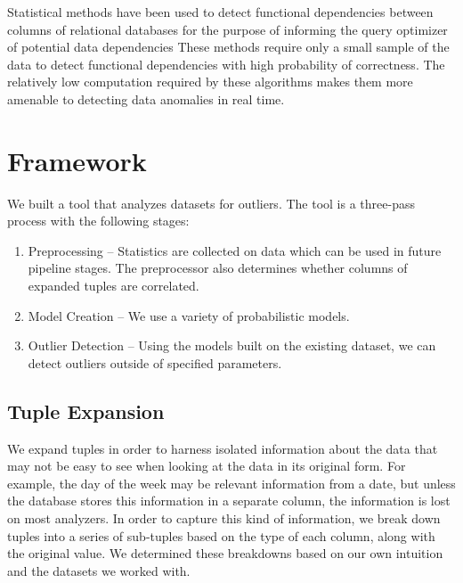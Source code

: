 \documentclass{vldb}
\begin{document}
Statistical methods have been used to detect functional dependencies between columns of relational databases for the purpose of informing the query optimizer of potential data dependencies \cite{Ilyas2004} 
These methods require only a small sample of the data to detect functional dependencies with high probability of correctness.
The relatively low computation required by these algorithms makes them more amenable to detecting data anomalies in real time.

\section{Framework}
We built a tool that analyzes datasets for outliers.
The tool is a three-pass process with the following stages:
\begin{enumerate}
\item Preprocessing -- Statistics are collected on data which can be used in future pipeline stages. The preprocessor also determines whether columns of expanded tuples are correlated.
\item Model Creation -- We use a variety of probabilistic models. 
\item Outlier Detection -- Using the models built on the existing dataset, we can detect outliers outside of specified parameters.
\end{enumerate}

\subsection{Tuple Expansion}
We expand tuples in order to harness isolated information about the data that may not be easy to see when looking at the data in its original form.
For example, the day of the week may be relevant information from a date, but unless the database stores this information in a separate column, the information is lost on most analyzers.
In order to capture this kind of information, we break down tuples into a series of sub-tuples based on the type of each column, along with the original value.
We determined these breakdowns based on our own intuition and the datasets we worked with.
\end{document}
